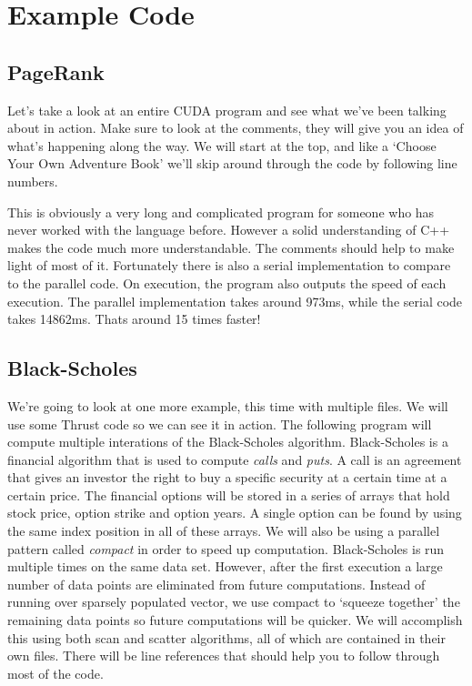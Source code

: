 \documentclass{article}
\begin{document}
  \section{Example Code}
  \subsection{PageRank}
  Let's take a look at an entire CUDA program and see what we've been talking about in action. Make sure to look at the comments, they will give you an idea of what's happening along the way. We will start at the top, and like a `Choose Your Own Adventure Book' we'll skip around through the code by following line numbers.
  
  

  This is obviously a very long and complicated program for someone who has never worked with the language before. However a solid understanding of C++ makes the code much more understandable. The comments should help to make light of most of it. Fortunately there is also a serial implementation to compare to the parallel code. On execution, the program also outputs the speed of each execution. The parallel implementation takes around 973ms, while the serial code takes 14862ms. Thats around 15 times faster!

\subsection{Black-Scholes}
  We're going to look at one more example, this time with multiple files. We will use some Thrust code so we can see it in action. The following program will compute multiple interations of the Black-Scholes algorithm. Black-Scholes is a financial algorithm that is used to compute \emph{calls} and \emph{puts}. A call is an agreement that gives an investor the right to buy a specific security at a certain time at a certain price. The financial options will be stored in a series of arrays that hold stock price, option strike and option years. A single option can be found by using the same index position in all of these arrays. We will also be using a parallel pattern called \emph{compact} in order to speed up computation. Black-Scholes is run multiple times on the same data set. However, after the first execution a large number of data points are eliminated from future computations. Instead of running over sparsely populated vector, we use compact to `squeeze together' the remaining data points so future computations will be quicker. We will accomplish this using both scan and scatter algorithms, all of which are contained in their own files. There will be line references that should help you to follow through most of the code.
\end{document}
